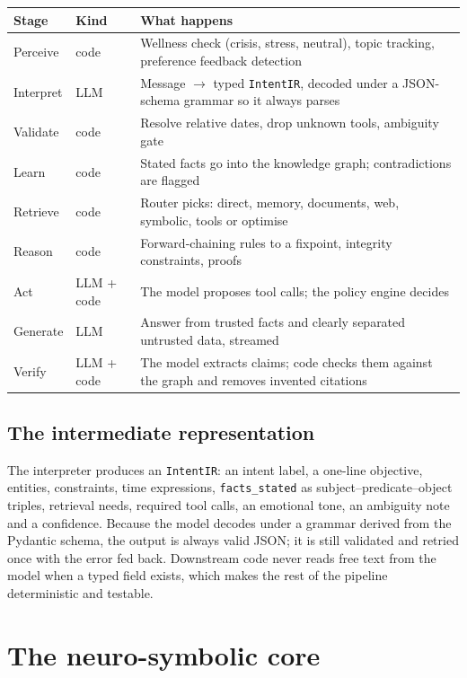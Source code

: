\documentclass[11pt,a4paper]{article}
\newcommand{\code}[1]{\texttt{#1}}
\begin{document}
\begin{center}
\begin{tabularx}{\linewidth}{@{}l l X@{}}
\toprule
Stage & Kind & What happens \\
\midrule
Perceive & code & Wellness check (crisis, stress, neutral), topic tracking, preference feedback detection \\
Interpret & LLM & Message $\rightarrow$ typed \code{IntentIR}, decoded under a JSON-schema grammar so it always parses \\
Validate & code & Resolve relative dates, drop unknown tools, ambiguity gate \\
Learn & code & Stated facts go into the knowledge graph; contradictions are flagged \\
Retrieve & code & Router picks: direct, memory, documents, web, symbolic, tools or optimise \\
Reason & code & Forward-chaining rules to a fixpoint, integrity constraints, proofs \\
Act & LLM + code & The model proposes tool calls; the policy engine decides \\
Generate & LLM & Answer from trusted facts and clearly separated untrusted data, streamed \\
Verify & LLM + code & The model extracts claims; code checks them against the graph and removes invented citations \\
\bottomrule
\end{tabularx}
\end{center}

\subsection{The intermediate representation}
The interpreter produces an \code{IntentIR}: an intent label, a one-line objective, entities, constraints, time expressions, \code{facts\_stated} as subject--predicate--object triples, retrieval needs, required tool calls, an emotional tone, an ambiguity note and a confidence. Because the model decodes under a grammar derived from the Pydantic schema, the output is always valid JSON; it is still validated and retried once with the error fed back. Downstream code never reads free text from the model when a typed field exists, which makes the rest of the pipeline deterministic and testable.

\section{The neuro-symbolic core}
\end{document}
